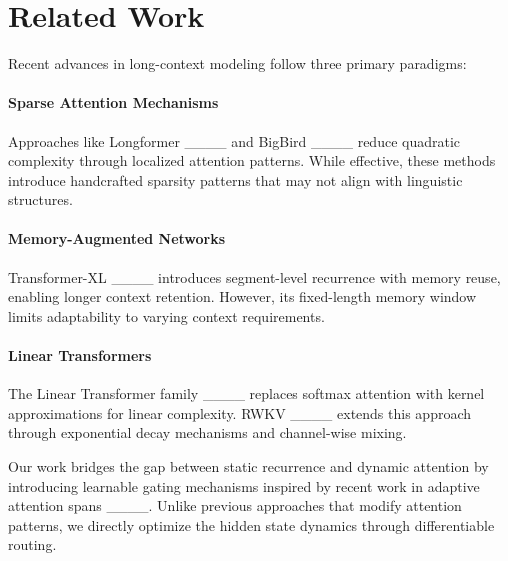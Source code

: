 \section{Related Work}
\label{sec:related}
Recent advances in long-context modeling follow three primary paradigms:

\paragraph{Sparse Attention Mechanisms} Approaches like Longformer ____ and BigBird ____ reduce quadratic complexity through localized attention patterns. While effective, these methods introduce handcrafted sparsity patterns that may not align with linguistic structures.

\paragraph{Memory-Augmented Networks} Transformer-XL ____ introduces segment-level recurrence with memory reuse, enabling longer context retention. However, its fixed-length memory window limits adaptability to varying context requirements.

\paragraph{Linear Transformers} The Linear Transformer family ____ replaces softmax attention with kernel approximations for linear complexity. RWKV ____ extends this approach through exponential decay mechanisms and channel-wise mixing.

Our work bridges the gap between static recurrence and dynamic attention by introducing learnable gating mechanisms inspired by recent work in adaptive attention spans ____. Unlike previous approaches that modify attention patterns, we directly optimize the hidden state dynamics through differentiable routing.